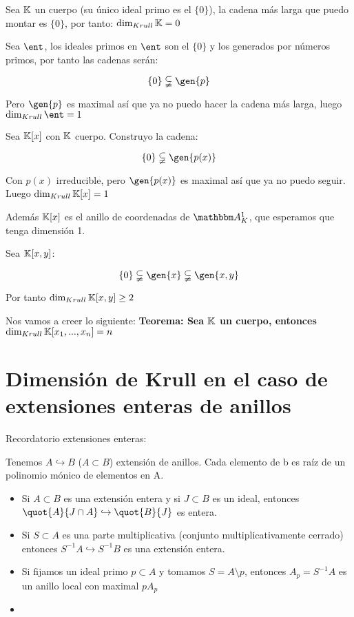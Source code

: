 \begin{example}
	Sea $\mathbb{K}$ un cuerpo (su único ideal primo es el $\{0\}$), la cadena más larga que puedo montar es $\{0\}$, por tanto: $\dim_{Krull} \mathbb{K} = 0$
\end{example}

\begin{example}
	Sea $\ent$, los ideales primos en $\ent$ son el $\{0\}$ y los generados por números primos, por tanto las cadenas serán:
	
	$$ \{0\} \subsetneqq \gen{p} $$
	
	Pero $\gen{p}$ es maximal así que ya no puedo hacer la cadena más larga, luego $\dim_{Krull} \ent = 1$
\end{example}

\begin{example}
	Sea $\mathbb{K}[x]$ con $\mathbb{K}$ cuerpo. Construyo la cadena:
	
	$$\{0\} \subsetneqq  \gen{p(x)} $$
	
	Con $p(x)$ irreducible, pero $\gen{p(x)}$ es maximal así que ya no puedo seguir. Luego  $\dim_{Krull} \mathbb{K}[x] = 1$
	
	Además $\mathbb{K}[x]$ es el anillo de coordenadas de $\A^1_K$, que esperamos que tenga dimensión 1.
\end{example}

\begin{example}
	Sea $\mathbb{K}[x,y]$:
	
	$$\{0\} \subsetneqq  \gen{x} \subsetneqq \gen{x,y} $$
	
	Por tanto  $\dim_{Krull} \mathbb{K}[x,y] \geq 2$
\end{example}

	Nos vamos a creer lo siguiente: \textbf{Teorema: Sea $\mathbb{K}$ un cuerpo, entonces $\dim_{Krull} \mathbb{K}[x_1,...,x_n]=n$}
	
\section{Dimensión de Krull en el caso de extensiones enteras de anillos}

Recordatorio extensiones enteras:

Tenemos $A \hookrightarrow B$ ($A \subset B$) extensión de anillos. Cada elemento de b es raíz de un polinomio mónico de elementos en A.
\begin{itemize}
	\item Si $A \subset B$ es una extensión entera y si $J \subset B$ es un ideal, entonces $\quot{A}{J \cap A} \hookrightarrow \quot{B}{J}$ es entera.
	\item Si $S \subset A$ es una parte multiplicativa (conjunto multiplicativamente cerrado) entonces $S^{-1}A \hookrightarrow S^{-1}B$ es una extensión entera.
	\item Si fijamos un ideal primo $p \subset A$ y tomamos $S=A \setminus p$, entonces $A_p=S^{-1}A$ es un anillo local con maximal $pA_p$
\end{itemize}






\begin{itemize}
	\item 
\end{itemize}